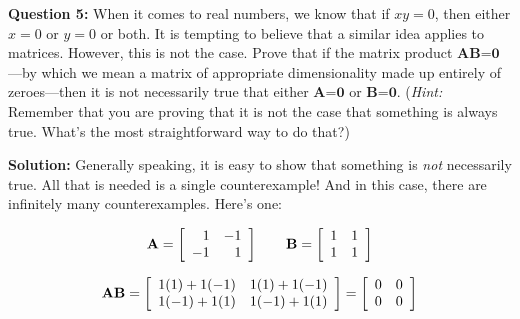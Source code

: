 \documentclass[12pt]{article}
\begin{document}
\textbf{Question 5:} When it comes to real numbers, we know that if $xy=0$, then either $x=0$ or $y=0$ or both. It is tempting to believe that a similar idea applies to matrices. However, this is not the case. Prove that if the matrix product \textbf{AB}=$\textbf{0}$---by which we mean a matrix of appropriate dimensionality made up entirely of zeroes---then it is not necessarily true that either \textbf{A}=$\textbf{0}$ or \textbf{B}=$\textbf{0}$. (\textit{Hint:} Remember that you are proving that it is not the case that something is always true. What's the most straightforward way to do that?)

\textbf{Solution:} Generally speaking, it is easy to show that something is \emph{not} necessarily true. All that is needed is a single counterexample! And in this case, there are infinitely many counterexamples. Here's one:

$$\textrm{\textbf{A}} = \left[\begin{array}{rr}
1 & -1\\
-1 & 1\end{array}\right] \qquad \textrm{\textbf{B}} = \left[\begin{array}{rr}
1 & 1\\
1 & 1\end{array}\right]$$

$$\textrm{\textbf{AB}} = \left[\begin{array}{rr}
1(1)+1(-1) & 1(1)+1(-1)\\
1(-1)+1(1) & 1(-1)+1(1)\end{array}\right] =  \left[\begin{array}{rr}
0 & 0\\
0 & 0\end{array}\right] $$
\end{document}

